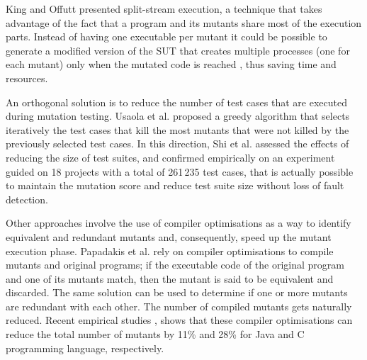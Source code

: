 King and Offutt \cite{king1991fortran} presented split-stream execution, a technique that takes advantage of the fact that a program and its mutants share most of the execution parts. Instead of having one executable per mutant it could be possible to generate a modified version of the SUT that creates multiple processes (one for each mutant) only when the mutated code is reached \cite{tokumoto2016muvm}, thus saving time and resources. 

An orthogonal solution is to reduce the number of test cases that are executed during mutation testing.
Usaola et al. \cite{usaola2012reduction} proposed a greedy algorithm that selects iteratively the test cases that kill the most mutants that were not killed by the previously selected test cases. In this direction, Shi et al. \cite{shi2014balancing} assessed the effects of reducing the size of test suites, and confirmed empirically on an experiment guided on 18 projects with a total of 261\,235 test cases, that is actually possible to maintain the mutation score and reduce test suite size without loss of fault detection.

Other approaches involve the use of compiler optimisations \cite{papadakis2015trivial,kintis2017detecting} as a way to identify equivalent and redundant mutants and, consequently, speed up the mutant execution phase. Papadakis et al. \cite{papadakis2015trivial, kintis2017detecting} rely on compiler optimisations to compile mutants and original programs; if the executable code of the original program and one of its mutants match, then the mutant is said to be equivalent and discarded. The same solution can be used to determine if one or more mutants are redundant with each other. The number of compiled mutants gets naturally reduced. Recent empirical studies \cite{kintis2017detecting}, shows that these compiler optimisations can reduce the total number of mutants by 11\% and 28\% for Java and C programming language, respectively.
